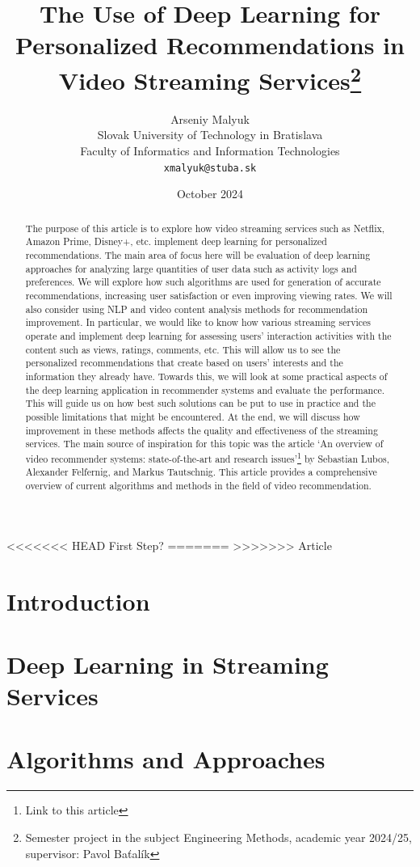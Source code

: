 \documentclass[12pt,english,a4paper]{article}
\title{The Use of Deep Learning for Personalized Recommendations in Video Streaming Services\thanks{Semester project in the subject Engineering Methods, academic year 2024/25, supervisor: Pavol Baťalík}}
\author{Arseniy Malyuk\\[2pt]
	{\small Slovak University of Technology in Bratislava}\\
	{\small Faculty of Informatics and Information Technologies}\\
	{\small \texttt{xmalyuk@stuba.sk}}
	}
\date{\small October 2024}
\begin{document}
\maketitle
<<<<<<< HEAD
First Step?
=======
>>>>>>> Article

\begin{abstract}
    The purpose of this article is to explore how video streaming services such as Netflix, Amazon Prime, Disney+, etc. implement deep learning for personalized recommendations. The main area of focus here will be evaluation of deep learning approaches for analyzing large quantities of user data such as activity logs and preferences. We will explore how such algorithms are used for generation of accurate recommendations, increasing user satisfaction or even improving viewing rates. We will also consider using NLP and video content analysis methods for recommendation improvement. In particular, we would like to know how various streaming services operate and implement deep learning for assessing users’ interaction activities with the content such as views, ratings, comments, etc. This will allow us to see the personalized recommendations that create based on users’ interests and the information they already have. Towards this, we will look at some practical aspects of the deep learning application in recommender systems and evaluate the performance. This will guide us on how best such solutions can be put to use in practice and the possible limitations that might be encountered. At the end, we will discuss how improvement in these methods affects the quality and effectiveness of the streaming services. The main source of inspiration for this topic was the article ‘An overview of video recommender systems: state-of-the-art and research issues’\cite{SAM-Overview}\footnote{Link to this article} by Sebastian Lubos, Alexander Felfernig, and Markus Tautschnig. This article provides a comprehensive overview of current algorithms and methods in the field of video recommendation.
\end{abstract}

\section{Introduction}

\section{Deep Learning in Streaming Services}

\section{Algorithms and Approaches}
\end{document}
